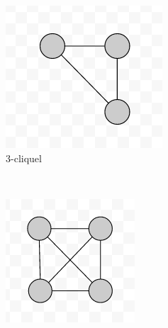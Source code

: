 \documentclass[runningheads,a4paper]{llncs}
\begin{document}
\begin{figure}
    \centering
    \begin{subfigure}[b]{0.3\textwidth}
        \includegraphics[width=\textwidth]{3-clique}
        \caption{3-cliquel}
        \label{fig:3clique}
    \end{subfigure}
    ~ %
    \begin{subfigure}[b]{0.3\textwidth}
        \includegraphics[width=\textwidth]{4-clique}

\end{subfigure}
\end{figure}
\end{document}
